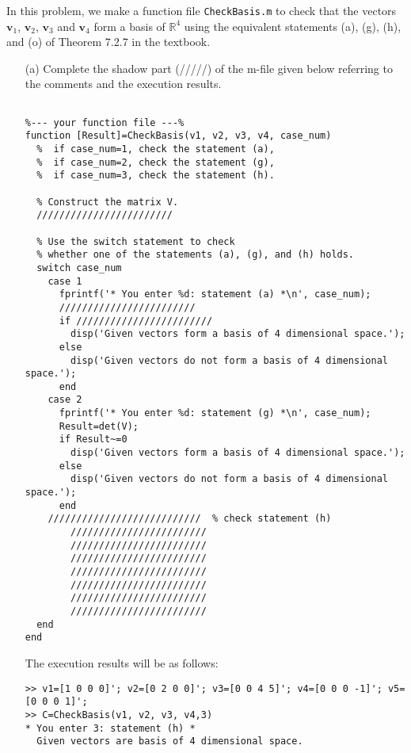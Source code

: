 \begin{exer}
In this problem, we make a function file \verb"CheckBasis.m" to check that the vectors $\mathbf{v}_{1}$, $\mathbf{v}_{2}$, $\mathbf{v}_{3}$ and $\mathbf{v}_{4}$ form a basis of $\mathbb{R}^4$ using the equivalent statements (a), (g), (h), and (o) of Theorem 7.2.7 in the textbook.

\begin{enumerate}
\item[(a)]
Complete the shadow part (/////) of the m-file given below referring to the comments and the execution results.

\begin{verbatim}

%--- your function file ---%
function [Result]=CheckBasis(v1, v2, v3, v4, case_num)
  %  if case_num=1, check the statement (a),
  %  if case_num=2, check the statement (g),
  %  if case_num=3, check the statement (h).

  % Construct the matrix V.
  ////////////////////////

  % Use the switch statement to check 
  % whether one of the statements (a), (g), and (h) holds.
  switch case_num
    case 1  
      fprintf('* You enter %d: statement (a) *\n', case_num);
      ////////////////////////
      if ////////////////////////
        disp('Given vectors form a basis of 4 dimensional space.');
      else
        disp('Given vectors do not form a basis of 4 dimensional space.');
      end
    case 2
      fprintf('* You enter %d: statement (g) *\n', case_num);
      Result=det(V);
      if Result~=0
        disp('Given vectors form a basis of 4 dimensional space.');
      else
        disp('Given vectors do not form a basis of 4 dimensional space.');
      end
    ///////////////////////////  % check statement (h)
        ////////////////////////
        ////////////////////////
        ////////////////////////
        ////////////////////////
        ////////////////////////
        ////////////////////////
        ////////////////////////
  end
end
\end{verbatim}

\vspace{3mm}

\noindent The execution results will be as follows:
\begin{verbatim}
>> v1=[1 0 0 0]'; v2=[0 2 0 0]'; v3=[0 0 4 5]'; v4=[0 0 0 -1]'; v5=[0 0 0 1]';
>> C=CheckBasis(v1, v2, v3, v4,3)
* You enter 3: statement (h) *
  Given vectors are basis of 4 dimensional space.


\end{verbatim}
\end{enumerate}
\end{exer}

